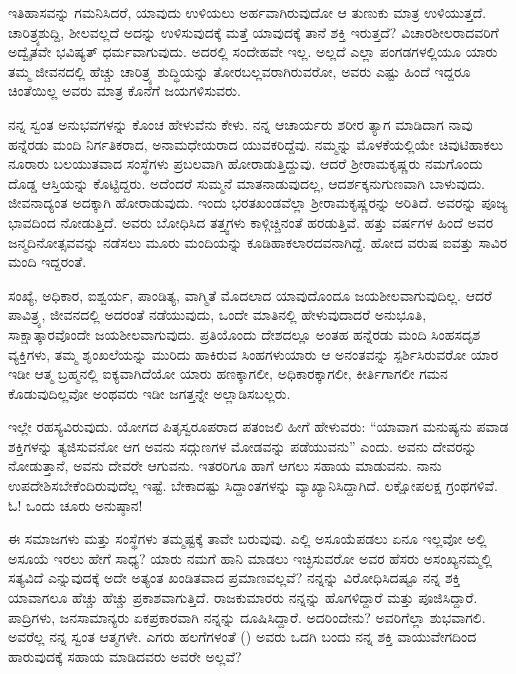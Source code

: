 \vspace{0.1cm}

ಇತಿಹಾಸವನ್ನು ಗಮನಿಸಿದರೆ, ಯಾವುದು ಉಳಿಯಲು ಅರ್ಹವಾಗಿರುವುದೋ ಆ ತುಣುಕು ಮಾತ್ರ ಉಳಿಯುತ್ತದೆ. ಚಾರಿತ್ರ್ಯಶುದ್ದಿ, ಶೀಲವಲ್ಲದೆ ಅದನ್ನು ಉಳಿಸುವುದಕ್ಕೆ ಮತ್ತೆ ಯಾವುದಕ್ಕೆ ತಾನೆ ಶಕ್ತಿ ಇರುತ್ತದೆ? ವಿಚಾರಶೀಲರಾದವರಿಗೆ ಅದ್ವೈತವೇ ಭವಿಷ್ಯತ್ ಧರ್ಮವಾಗುವುದು. ಅದರಲ್ಲಿ ಸಂದೇಹವೇ ಇಲ್ಲ. ಅಲ್ಲದೆ ಎಲ್ಲಾ ಪಂಗಡಗಳಲ್ಲಿಯೂ ಯಾರು ತಮ್ಮ ಜೀವನದಲ್ಲಿ ಹೆಚ್ಚು ಚಾರಿತ್ರ್ಯ ಶುದ್ಧಿಯನ್ನು ತೋರಬಲ್ಲವರಾಗಿರುವರೋ, ಅವರು ಎಷ್ಟು ಹಿಂದೆ ಇದ್ದರೂ ಚಿಂತೆಯಿಲ್ಲ ಅವರು ಮಾತ್ರ ಕೊನೆಗೆ ಜಯಗಳಿಸುವರು.

\vspace{0.1cm}

ನನ್ನ ಸ್ವಂತ ಅನುಭವಗಳನ್ನು ಕೊಂಚ ಹೇಳುವೆನು ಕೇಳು. ನನ್ನ ಆಚಾರ್ಯರು ಶರೀರ ತ್ಯಾಗ ಮಾಡಿದಾಗ ನಾವು ಹನ್ನೆರಡು ಮಂದಿ ನಿರ್ಗತಿಕರಾದ, ಅನಾಮಧೇಯರಾದ ಯುವಕರಿದ್ದೆವು. ನಮ್ಮನ್ನು ಮೊಳಕೆಯಲ್ಲಿಯೇ ಚಿವುಟಿಹಾಕಲು ನೂರಾರು ಬಲಯುತವಾದ ಸಂಸ್ಥೆಗಳು ಪ್ರಬಲವಾಗಿ ಹೋರಾಡುತ್ತಿದ್ದುವು. ಆದರೆ ಶ‍್ರೀರಾಮಕೃಷ್ಣರು ನಮಗೊಂದು ದೊಡ್ಡ ಆಸ್ತಿಯನ್ನು ಕೊಟ್ಟಿದ್ದರು. ಅದೆಂದರೆ ಸುಮ್ಮನೆ ಮಾತನಾಡುವುದಲ್ಲ, ಆದರ್ಶಕ್ಕನುಗುಣವಾಗಿ ಬಾಳುವುದು. ಜೀವನಾದ್ಯಂತ ಅದಕ್ಕಾಗಿ ಹೋರಾಡುವುದು. ಇಂದು ಭರತಖಂಡವೆಲ್ಲಾ ಶ‍್ರೀರಾಮಕೃಷ್ಣರನ್ನು ಅರಿತಿದೆ. ಅವರನ್ನು ಪೂಜ್ಯ ಭಾವದಿಂದ ನೋಡುತ್ತಿದೆ. ಅವರು ಬೋಧಿಸಿದ ತತ್ತ್ವಗಳು ಕಾಳ್ಗಿಚ್ಚಿನಂತೆ ಹರಡುತ್ತಿವೆ. ಹತ್ತು ವರ್ಷಗಳ ಹಿಂದೆ ಅವರ ಜನ್ಮದಿನೋತ್ಸವವನ್ನು ನಡೆಸಲು ಮೂರು ಮಂದಿಯನ್ನು ಕೂಡಿಹಾಕಲಾರದವನಾಗಿದ್ದೆ. ಹೋದ ವರುಷ ಐವತ್ತು ಸಾವಿರ ಮಂದಿ ಇದ್ದರಂತೆ.

\vspace{0.1cm}

ಸಂಖ್ಯೆ, ಅಧಿಕಾರ, ಐಶ್ವರ್ಯ, ಪಾಂಡಿತ್ಯ, ವಾಗ್ಮಿತೆ ಮೊದಲಾದ ಯಾವುದೊಂದೂ ಜಯಶೀಲವಾಗುವುದಿಲ್ಲ. ಆದರೆ ಪಾವಿತ್ರ್ಯ, ಜೀವನದಲ್ಲಿ ಅದರಂತೆ ನಡೆಯುವುದು, ಒಂದೇ ಮಾತಿನಲ್ಲಿ ಹೇಳುವುದಾದರೆ ಅನುಭೂತಿ, ಸಾಕ್ಷಾತ್ಕಾರವೊಂದೇ ಜಯಶೀಲವಾಗುವುದು. ಪ್ರತಿಯೊಂದು ದೇಶದಲ್ಲೂ ಅಂತಹ ಹನ್ನೆರಡು ಮಂದಿ ಸಿಂಹಸದೃಶ ವ್ಯಕ್ತಿಗಳು, ತಮ್ಮ ಶೃಂಖಲೆಯನ್ನು ಮುರಿದು ಹಾಕಿರುವ ಸಿಂಹಗಳು\enginline{-}ಯಾರು ಆ ಅನಂತವನ್ನು ಸ್ಪರ್ಶಿಸಿರುವರೋ ಯಾರ ಇಡೀ ಆತ್ಮ ಬ್ರಹ್ಮನಲ್ಲಿ ಐಕ್ಯವಾಗಿದೆಯೋ ಯಾರು ಹಣಕ್ಕಾಗಲೀ, ಅಧಿಕಾರಕ್ಕಾಗಲೀ, ಕೀರ್ತಿಗಾಗಲೀ ಗಮನ ಕೊಡುವುದಿಲ್ಲವೋ ಅಂಥವರು\enginline{-} ಇಡೀ ಜಗತ್ತನ್ನೇ ಅಲ್ಲಾಡಿಸಬಲ್ಲರು.

\vspace{0.1cm}

ಇಲ್ಲೇ ರಹಸ್ಯವಿರುವುದು. ಯೋಗದ ಪಿತೃಸ್ವರೂಪರಾದ ಪತಂಜಲಿ ಹೀಗೆ ಹೇಳುವರು: “ಯಾವಾಗ ಮನುಷ್ಯನು ಪವಾಡ ಶಕ್ತಿಗಳನ್ನು ತ್ಯಜಿಸುವನೋ ಆಗ ಅವನು ಸದ್ಗುಣಗಳ ಮೋಡವನ್ನು ಪಡೆಯುವನು” ಎಂದು. ಅವನು ದೇವರನ್ನು ನೋಡುತ್ತಾನೆ, ಅವನು ದೇವರೇ ಆಗುವನು. ಇತರರಿಗೂ ಹಾಗೆ ಆಗಲು ಸಹಾಯ ಮಾಡುವನು. ನಾನು ಉಪದೇಶಿಸಬೇಕೆಂದಿರುವುದೆಲ್ಲ ಇಷ್ಟೆ. ಬೇಕಾದಷ್ಟು ಸಿದ್ದಾಂತಗಳನ್ನು ವ್ಯಾಖ್ಯಾನಿಸಿದ್ದಾಗಿದೆ. ಲಕ್ಷೋಪಲಕ್ಷ ಗ್ರಂಥಗಳಿವೆ. ಓ! ಒಂದು ಚೂರು ಅನುಷ್ಠಾನ!

\vspace{0.1cm}

ಈ ಸಮಾಜಗಳು ಮತ್ತು ಸಂಸ್ಥೆಗಳು ತಮ್ಮಷ್ಟಕ್ಕೆ ತಾವೇ ಬರುವುವು. ಎಲ್ಲಿ ಅಸೂಯೆಪಡಲು ಏನೂ ಇಲ್ಲವೋ ಅಲ್ಲಿ ಅಸೂಯೆ ಇರಲು ಹೇಗೆ ಸಾಧ್ಯ? ಯಾರು ನಮಗೆ ಹಾನಿ ಮಾಡಲು ಇಚ್ಛಿಸುವರೋ ಅವರ ಹೆಸರು ಅಸಂಖ್ಯ\enginline{-}ನಮ್ಮಲ್ಲಿ ಸತ್ಯವಿದೆ ಎನ್ನುವುದಕ್ಕೆ ಅದೇ ಅತ್ಯಂತ ಖಂಡಿತವಾದ ಪ್ರಮಾಣವಲ್ಲವೆ? ನನ್ನನ್ನು ವಿರೋಧಿಸಿದಷ್ಟೂ ನನ್ನ ಶಕ್ತಿ ಯಾವಾಗಲೂ ಹೆಚ್ಚು ಹೆಚ್ಚು ಪ್ರಕಾಶವಾಗುತ್ತಿದೆ. ರಾಜಕುಮಾರರು ನನ್ನನ್ನು ಹೊಗಳಿದ್ದಾರೆ ಮತ್ತು ಪೂಜಿಸಿದ್ದಾರೆ. ಪಾದ್ರಿಗಳು, ಜನಸಾಮಾನ್ಯರು ಏಕಪ್ರಕಾರವಾಗಿ ನನ್ನನ್ನು ದೂಷಿಸಿದ್ದಾರೆ. ಅದರಿಂದೇನು? ಅವರಿಗೆಲ್ಲಾ ಶುಭವಾಗಲಿ. ಅವರೆಲ್ಲ ನನ್ನ ಸ್ವಂತ ಆತ್ಮಗಳೇ. ಎಗರು ಹಲಗೆಗಳಂತೆ () ಅವರು ಒದಗಿ ಬಂದು ನನ್ನ ಶಕ್ತಿ ವಾಯುವೇಗದಿಂದ ಹಾರುವುದಕ್ಕೆ ಸಹಾಯ ಮಾಡಿದವರು ಅವರೇ ಅಲ್ಲವೆ?

